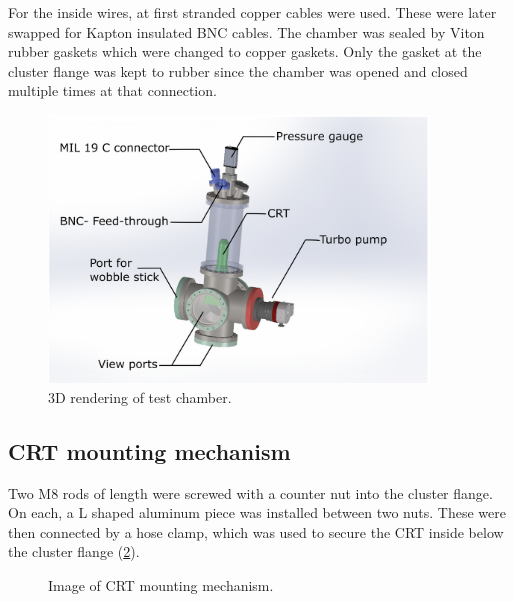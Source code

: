 For the inside wires, at first stranded copper cables were used. These were later swapped for Kapton insulated BNC cables. The chamber was sealed by Viton rubber gaskets which were changed to copper gaskets. Only the gasket at the cluster flange was kept to rubber since the chamber was opened and closed multiple times at that connection.
 
\begin{figure}[ht]
	\centering
 	
	\includegraphics[width=0.9\textwidth]{./Chapters/vacuum-chamber/vacuum-chamber-annotated} %
	
	\caption{3D rendering of test chamber.}
	\label{fig:3D rendering of test chamber}
\end{figure}
 
\subsection{CRT mounting mechanism}
\label{subsec:CRT mounting mechanism}

Two M8 rods of length  were screwed with a counter nut into the cluster flange. On each, a L shaped aluminum piece was installed between two nuts. These were then connected by a hose clamp, which was used to secure the CRT inside below the cluster flange (\cref{fig:Image of CRT mounting mechanism}).
 

\begin{figure}[h]
	\centering
	
	
	\caption{Image of CRT mounting mechanism.}
	\label{fig:Image of CRT mounting mechanism}
\end{figure}



